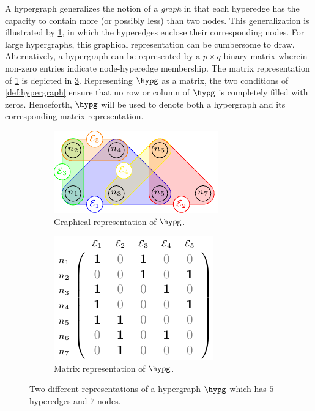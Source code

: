 \documentclass[aps, 10pt, english, twoside, twocolumn, pra, nofootinbib, tightenlines, longbibliography, superscriptaddress]{revtex4-1}
\begin{document}
    A hypergraph generalizes the notion of a \textit{graph} in that each hyperedge has the capacity to contain more (or possibly less) than two nodes. This generalization is illustrated by \cref{fig:hypergraph_diagram_example}, in which the hyperedges enclose their corresponding nodes. For large hypergraphs, this graphical representation can be cumbersome to draw. Alternatively, a hypergraph can be represented by a $p\times q$ binary matrix wherein non-zero entries indicate node-hyperedge membership. The matrix representation of \cref{fig:hypergraph_diagram_example} is depicted in \cref{fig:hypergraph_matrix_example}. Representing $\hypg$ as a matrix, the two conditions of \cref{def:hypergraph} ensure that no row or column of $\hypg$ is completely filled with zeros. Henceforth, $\hypg$ will be used to denote both a hypergraph and its corresponding matrix representation.
    \begin{figure}
    \begin{subfigure}{\linewidth}
        \includegraphics[width=\linewidth]{figures/hypergraph_diagram_1_standalone/figure.pdf}
        \caption{Graphical representation of $\hypg$.}
        \label{fig:hypergraph_diagram_example}
    \end{subfigure}
    \begin{subfigure}{0.8\linewidth}
        \includegraphics[width=0.8\linewidth]{figures/hypergraph_matrix_1_standalone/figure.pdf}
        \caption{Matrix representation of $\hypg$.}
        \label{fig:hypergraph_matrix_example}
    \end{subfigure}
    \caption{Two different representations of a hypergraph $\hypg$ which has $5$ hyperedges and $7$ nodes.}
    \end{figure}
\end{document}
